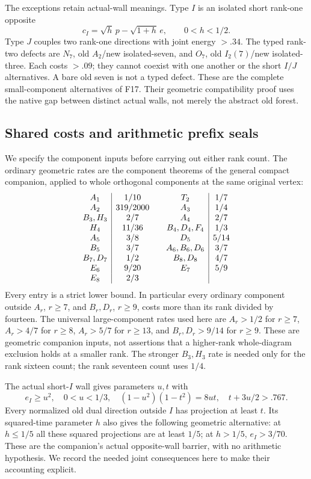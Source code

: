 \documentclass[11pt]{article}
\newcommand{\supp}[1]{\textsf{#1}}
\begin{document}
The exceptions retain actual-wall meanings. Type $I$ is an isolated
short rank-one opposite
\[
 c_I=\sqrt h\,p-\sqrt{1+h}\,e,\qquad0<h<1/2.
\]
Type $J$ couples two rank-one directions with joint energy $>.34$.
The typed rank-two defects are $N_7$, old $A_2$/new isolated-seven,
and $O_7$, old $I_2(7)$/new isolated-three. Each costs $>.09$;
they cannot coexist with one another or the short $I/J$ alternatives.
A bare old seven is not a typed defect.
These are the complete small-component alternatives of \supp{F17}.
Their geometric compatibility proof uses the native gap between
distinct actual walls, not merely the abstract old forest.

\subsection{Shared costs and arithmetic prefix seals}\label{subsec:shared-seals}

We specify the component inputs before carrying out either rank count.
The ordinary geometric rates are the component theorems of the general
compact companion, applied to whole orthogonal components at the same
original vertex:
\[
\begin{array}{c|c@{\qquad}c|c}
A_1&1/10&T_2&1/7\\
A_2&319/2000&A_3&1/4\\
B_3,H_3&2/7&A_4&2/7\\
H_4&11/36&B_4,D_4,F_4&1/3\\
A_5&3/8&D_5&5/14\\
B_5&3/7&A_6,B_6,D_6&3/7\\
B_7,D_7&1/2&B_8,D_8&4/7\\
E_6&9/20&E_7&5/9\\
E_8&2/3&&
\end{array}
\]
Every entry is a strict lower bound. In particular every ordinary
component outside $A_r$, $r\ge7$, and $B_r,D_r$, $r\ge9$, costs
more than its rank divided by fourteen. The universal large-component
rates used here are $A_r>1/2$ for $r\ge7$, $A_r>4/7$ for $r\ge8$,
$A_r>5/7$ for $r\ge13$, and $B_r,D_r>9/14$ for $r\ge9$.
These are geometric companion inputs, not assertions that a higher-rank
whole-diagram exclusion holds at a smaller rank. The stronger $B_3,H_3$
rate is needed only for the rank sixteen count; the rank seventeen count uses $1/4$.

The actual short-$I$ wall gives parameters $u,t$ with
\begin{equation}\label{eq:Ibarrier}
 e_I\ge u^2,\quad0<u<1/3,\quad
 (1-u^2)(1-t^2)=8ut,\quad t+3u/2>.767.
\end{equation}
Every normalized old dual direction outside $I$ has projection at
least $t$. Its squared-time parameter $h$ also gives the following
geometric alternative: at $h\le1/5$ all these squared projections are
at least $1/5$; at $h>1/5$, $e_I>3/70$.
These are the companion's actual opposite-wall barrier, with no
arithmetic hypothesis. We record the needed joint consequences here
to make their accounting explicit.
\end{document}
